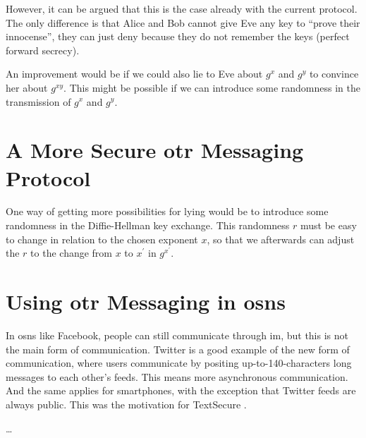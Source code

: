 However, it can be argued that this is the case already with the current 
protocol.
The only difference is that Alice and Bob cannot give Eve any key to 
\enquote{prove their innocense}, they can just deny because they do not 
remember the keys (perfect forward secrecy).

An improvement would be if we could also lie to Eve about \(g^x\) and \(g^y\) 
to convince her about \(g^{xy}\).
This might be possible if we can introduce some randomness in the transmission 
of \(g^x\) and \(g^y\).


\section{A More Secure \acs{otr} Messaging Protocol}

One way of getting more possibilities for lying would be to introduce some 
randomness in the Diffie-Hellman key exchange.
This randomness \(r\) must be easy to change in relation to the chosen exponent 
\(x\), so that we afterwards can adjust the \(r\) to the change from \(x\) to 
\(x^\prime\) in \(g^{x^\prime}\).


\section{Using \acs{otr} Messaging in \acsp{osn}}

In \acp{osn} like Facebook, people can still communicate through \ac{im}, but 
this is not the main form of communication.
Twitter is a good example of the new form of communication, where users 
communicate by positing up-to-140-characters long messages to each other's 
feeds.
This means more asynchronous communication.
And the same applies for smartphones, with the exception that Twitter feeds are 
always public.
This was the motivation for TextSecure \cite{TSasynch}.

\dots


\printbibliography
